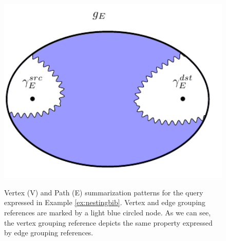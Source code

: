 \begin{figure}[!tp]
\begin{minipage}[!t]{0.45\textwidth}
		\label{fig:edgewithIntersectionNonSRC}
	\end{minipage}\quad \begin{minipage}[!t]{0.45\textwidth}
		\centering
		\includegraphics[width=1\textwidth]{fig/06nesting/03_edge_analysis.pdf}
		\label{fig:edgeWithNoIntersection}
	\end{minipage}
	\caption{Vertex (V) and Path (E) summarization patterns for the query expressed in Example \vref{ex:nestingbib}. Vertex and edge grouping references are marked by a light blue circled node. As we can see, the vertex grouping reference depicts the same property expressed by edge grouping references.}
	\label{fig:patternAnalysis}
\end{figure}
